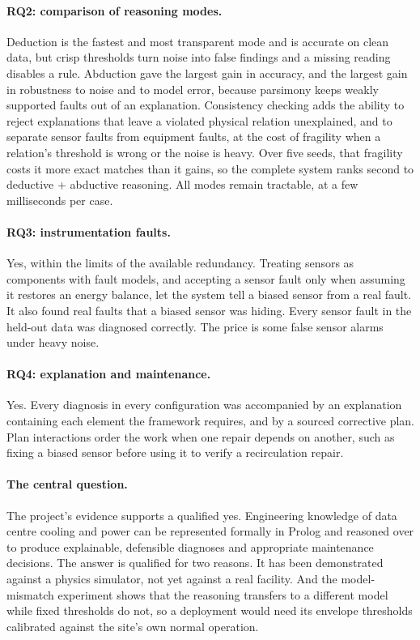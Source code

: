 \paragraph{RQ2: comparison of reasoning modes.} Deduction is the fastest and most transparent mode and is accurate on clean data, but crisp thresholds turn noise into false findings and a missing reading disables a rule. Abduction gave the largest gain in accuracy, and the largest gain in robustness to noise and to model error, because parsimony keeps weakly supported faults out of an explanation. Consistency checking adds the ability to reject explanations that leave a violated physical relation unexplained, and to separate sensor faults from equipment faults, at the cost of fragility when a relation's threshold is wrong or the noise is heavy. Over five seeds, that fragility costs it more exact matches than it gains, so the complete system ranks second to deductive + abductive reasoning. All modes remain tractable, at a few milliseconds per case.

\paragraph{RQ3: instrumentation faults.} Yes, within the limits of the available redundancy. Treating sensors as components with fault models, and accepting a sensor fault only when assuming it restores an energy balance, let the system tell a biased sensor from a real fault. It also found real faults that a biased sensor was hiding. Every sensor fault in the held-out data was diagnosed correctly. The price is some false sensor alarms under heavy noise.

\paragraph{RQ4: explanation and maintenance.} Yes. Every diagnosis in every configuration was accompanied by an explanation containing each element the framework requires, and by a sourced corrective plan. Plan interactions order the work when one repair depends on another, such as fixing a biased sensor before using it to verify a recirculation repair.

\paragraph{The central question.} The project's evidence supports a qualified yes. Engineering knowledge of data centre cooling and power can be represented formally in Prolog and reasoned over to produce explainable, defensible diagnoses and appropriate maintenance decisions. The answer is qualified for two reasons. It has been demonstrated against a physics simulator, not yet against a real facility. And the model-mismatch experiment shows that the reasoning transfers to a different model while fixed thresholds do not, so a deployment would need its envelope thresholds calibrated against the site's own normal operation.


